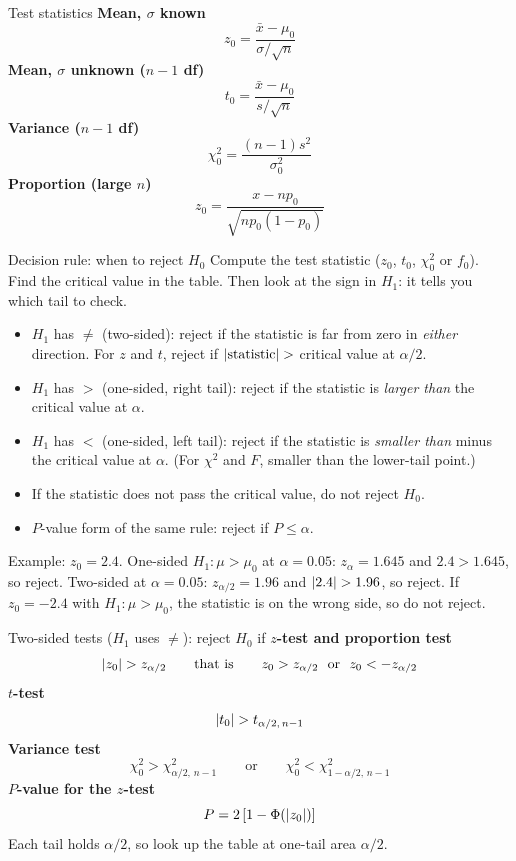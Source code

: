 \begin{formulabox}{Test statistics}
\textbf{Mean, $\sigma$ known}
\[ z_0=\frac{\bar{x}-\mu_0}{\sigma/\sqrt n} \]
\textbf{Mean, $\sigma$ unknown ($n-1$ df)}
\[ t_0=\frac{\bar{x}-\mu_0}{s/\sqrt n} \]
\textbf{Variance ($n-1$ df)}
\[ \chi_0^2=\frac{(n-1)s^2}{\sigma_0^2} \]
\textbf{Proportion (large $n$)}
\[ z_0=\frac{x-np_0}{\sqrt{np_0(1-p_0)}} \]
\end{formulabox}

\begin{formulabox}{Decision rule: when to reject $H_0$}
Compute the test statistic ($z_0$, $t_0$, $\chi_0^2$ or $f_0$). Find the critical value in the table. Then look at the sign in $H_1$: it tells you which tail to check.
\begin{itemize}
  \item $H_1$ has $\ne$ (two-sided): reject if the statistic is far from zero in \emph{either} direction. For $z$ and $t$, reject if $\lvert\text{statistic}\rvert>$ critical value at $\alpha/2$.
  \item $H_1$ has $>$ (one-sided, right tail): reject if the statistic is \emph{larger than} the critical value at $\alpha$.
  \item $H_1$ has $<$ (one-sided, left tail): reject if the statistic is \emph{smaller than} minus the critical value at $\alpha$. (For $\chi^2$ and $F$, smaller than the lower-tail point.)
  \item If the statistic does not pass the critical value, do not reject $H_0$.
  \item $P$-value form of the same rule: reject if $P\le\alpha$.
\end{itemize}
Example: $z_0=2.4$. One-sided $H_1:\mu>\mu_0$ at $\alpha=0.05$: $z_\alpha=1.645$ and $2.4>1.645$, so reject. Two-sided at $\alpha=0.05$: $z_{\alpha/2}=1.96$ and $\lvert2.4\rvert>1.96$, so reject. If $z_0=-2.4$ with $H_1:\mu>\mu_0$, the statistic is on the wrong side, so do not reject.
\end{formulabox}

\begin{formulabox}{Two-sided tests ($H_1$ uses $\ne$): reject $H_0$ if}
\textbf{$z$-test and proportion test}
\[ \abs{z_0}>z_{\alpha/2}\qquad\text{that is}\qquad z_0>z_{\alpha/2}\ \text{ or }\ z_0<-z_{\alpha/2} \]
\textbf{$t$-test}
\[ \lvert t_0\rvert>t_{\alpha/2,\,n-1} \]
\textbf{Variance test}
\[ \chi_0^2>\chi^2_{\alpha/2,\,n-1}\qquad\text{or}\qquad\chi_0^2<\chi^2_{1-\alpha/2,\,n-1} \]
\textbf{$P$-value for the $z$-test}
\[ P=2\,[1-\Phi(\lvert z_0\rvert)] \]
Each tail holds $\alpha/2$, so look up the table at one-tail area $\alpha/2$.
\end{formulabox}

